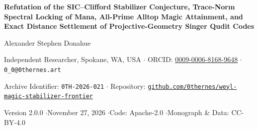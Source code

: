 \documentclass[11pt,letterpaper]{article}
\theoremstyle{plain}
\theoremstyle{definition}
\theoremstyle{remark}
\begin{document}
\begin{center}
  {\LARGE\bfseries Refutation of the SIC--Clifford Stabilizer Conjecture, Trace-Norm Spectral Locking of Mana, All-Prime Alltop Magic Attainment, and Exact Distance Settlement of Projective-Geometry Singer Qudit Codes\par}
  \vspace{0.9em}
  {\large Alexander Stephen Donahue\par}
  \vspace{0.3em}
  {\small Independent Researcher, Spokane, WA, USA \quad$\cdot$\quad
  ORCID: \href{https://orcid.org/0009-0006-8168-9648}{0009-0006-8168-9648} \quad$\cdot$\quad
  \texttt{0\_0@0thernes.art}\par}
  \vspace{0.3em}
  {\small Archive Identifier: \texttt{0TH-2026-021} \quad$\cdot$\quad
  Repository: \href{https://github.com/0thernes/weyl-magic-stabilizer-frontier}{\texttt{github.com/0thernes/weyl-magic-stabilizer-frontier}}\par}
  \vspace{0.3em}
  {\small Version 2.0.0 \quad$\cdot$\quad November 27, 2026 \quad$\cdot$\quad Code: Apache-2.0 \quad$\cdot$\quad Monograph \& Data: CC-BY-4.0\par}
\end{center}
\end{document}
